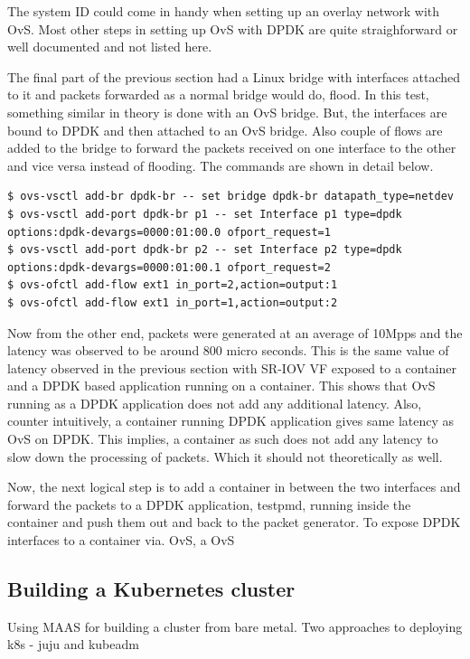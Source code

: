 \documentclass[english, 12pt, a4paper, elec, utf8, a-1b, online]{aaltothesis}
\begin{document}
The system ID could come in handy when setting up an overlay network with OvS. Most other steps in setting up OvS with DPDK are quite straighforward or well documented and not listed here.

The final part of the previous section had a Linux bridge with interfaces attached to it and packets forwarded as a normal bridge would do, flood. In this test, something similar in theory is done with an OvS bridge. But, the interfaces are bound to DPDK and then attached to an OvS bridge. Also couple of flows are added to the bridge to forward the packets received on one interface to the other and vice versa instead of flooding. The commands are shown in detail below.

\begin{lstlisting}[basicstyle={\small\ttfamily}]
$ ovs-vsctl add-br dpdk-br -- set bridge dpdk-br datapath_type=netdev
$ ovs-vsctl add-port dpdk-br p1 -- set Interface p1 type=dpdk options:dpdk-devargs=0000:01:00.0 ofport_request=1
$ ovs-vsctl add-port dpdk-br p2 -- set Interface p2 type=dpdk options:dpdk-devargs=0000:01:00.1 ofport_request=2
$ ovs-ofctl add-flow ext1 in_port=2,action=output:1
$ ovs-ofctl add-flow ext1 in_port=1,action=output:2
\end{lstlisting}

Now from the other end, packets were generated at an average of 10Mpps and the latency was observed to be around 800 micro seconds. This is the same value of latency observed in the previous section with SR-IOV VF exposed to a container and a DPDK based application running on a container. This shows that OvS running as a DPDK application does not add any additional latency. Also, counter intuitively, a container running DPDK application gives same latency as OvS on DPDK. This implies, a container as such does not add any latency to slow down the processing of packets. Which it should not theoretically as well.

Now, the next logical step is to add a container in between the two interfaces and forward the packets to a DPDK application, testpmd, running inside the container and push them out and back to the packet generator. To expose DPDK interfaces to a container via. OvS, a OvS

\subsection{Building a Kubernetes cluster}
Using MAAS for building a cluster from bare metal. Two approaches to deploying k8s - juju and kubeadm
\end{document}
